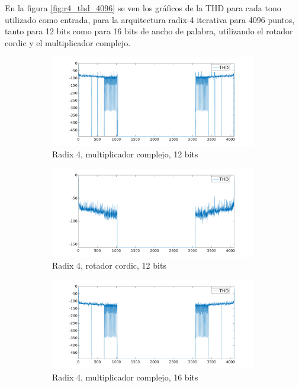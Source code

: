 En la figura \ref{fig:r4_thd_4096} se ven los gráficos de la THD para cada tono utilizado como
entrada, para la arquitectura radix-4 iterativa para 4096 puntos, tanto para 12 bits como para 16 bits de
ancho de palabra, utilizando el rotador cordic y el multiplicador complejo.

\begin{figure}[htbp!]
        \advance\leftskip-1.5cm
        \begin{subfigure}{0.6\textwidth}%
        \includegraphics[width=9cm]{./figures/thd_r4_4096_12_mul.png}
        \caption{Radix 4, multiplicador complejo, 12 bits}
        \end{subfigure}%
        \begin{subfigure}{0.6\textwidth}%
        \includegraphics[width=9cm]{./figures/thd_r4_4096_12_cor.png}
        \caption{Radix 4, rotador cordic, 12 bits}
        \end{subfigure} 
        \begin{subfigure}{0.6\textwidth}%
        \includegraphics[width=9cm]{./figures/thd_r4_4096_16_mul.png}
        \caption{Radix 4, multiplicador complejo, 16 bits}
        \end{subfigure}%
        \begin{subfigure}{0.6\textwidth}%

\end{subfigure}
\end{figure}
